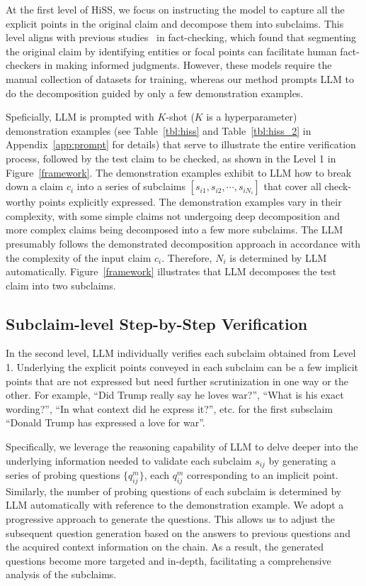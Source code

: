 \documentclass[11pt]{article}
\begin{document}
At the first level of HiSS, we focus on instructing the model to capture all the explicit points in the original claim and decompose them into subclaims.  This level aligns with previous studies~\cite{ousidhoum2022varifocal,fan2020generating} in fact-checking, which found that segmenting the original claim by identifying entities or focal points can facilitate human fact-checkers in making informed judgments. However, these models require the manual collection of datasets for training, whereas our method prompts LLM to do the decomposition guided by only a few demonstration examples.

Speficially, LLM is prompted with $K$-shot ($K$ is a hyperparameter) demonstration examples (see Table~\ref{tbl:hiss} and Table~\ref{tbl:hiss_2} in Appendix~\ref{app:prompt} for details) that serve to illustrate the entire verification process, followed by the test claim to be checked, as shown in the Level 1 in Figure~\ref{framework}. 
The demonstration examples exhibit to LLM how to break down a claim $c_i$ into a series of subclaims $[s_{i1}, s_{i2}, \cdots, s_{iN_i}]$ that cover all check-worthy points explicitly expressed. 
The demonstration examples vary in their complexity, with some simple claims not undergoing deep decomposition and more complex claims being decomposed into a few more subclaims. The LLM presumably follows the demonstrated decomposition approach in accordance with the complexity of the input claim $c_i$. Therefore, $N_i$ is determined by LLM automatically. Figure~\ref{framework} illustrates that LLM decomposes the test claim into two subclaims.

\subsection{Subclaim-level Step-by-Step Verification}
\label{sec:sbs}
In the second level, LLM  individually verifies each subclaim obtained from Level 1. Underlying the explicit points conveyed in each subclaim can be a few implicit points that are not expressed but need further scrutinization in one way or the other. For example, ``Did Trump really say he loves war?'', ``What is his exact wording?'', ``In what context did he express it?'', etc. for the first subsclaim ``Donald Trump has expressed a love for war''.

Specifically, we leverage the reasoning capability of LLM to delve deeper into the underlying information needed to validate each subclaim $s_{ij}$ by generating a series of probing questions $\{q_{ij}^m\}$, each $q_{ij}^m$ corresponding to an implicit point. Similarly, the number of probing questions of each subclaim is determined by LLM automatically with reference to the demonstration example.
We adopt a progressive approach to generate the questions. This allows us to adjust the subsequent question generation based on the answers to previous questions and the acquired context information on the chain. As a result, the generated questions become more targeted and in-depth, facilitating a comprehensive analysis of the subclaims.
\end{document}
